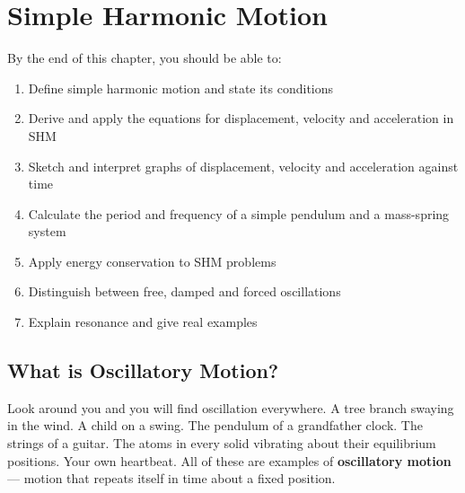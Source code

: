 %

\chapter{Simple Harmonic Motion}
\label{ch:shm}


\begin{objectivebox}
By the end of this chapter, you should be able to:
\begin{enumerate}[noitemsep]
  \item Define simple harmonic motion and state its
  conditions
  \item Derive and apply the equations for displacement,
  velocity and acceleration in SHM
  \item Sketch and interpret graphs of displacement,
  velocity and acceleration against time
  \item Calculate the period and frequency of a simple
  pendulum and a mass-spring system
  \item Apply energy conservation to SHM problems
  \item Distinguish between free, damped and forced
  oscillations
  \item Explain resonance and give real examples
\end{enumerate}
\end{objectivebox}

\vspace{0.4cm}

\minitoc

\vspace{0.5cm}

\section{What is Oscillatory Motion?}

Look around you and you will find oscillation everywhere.
A tree branch swaying in the wind. A child on a swing.
The pendulum of a grandfather clock. The strings of a
guitar. The atoms in every solid vibrating about their
equilibrium positions. Your own heartbeat. All of these
are examples of \textbf{oscillatory motion} --- motion
that repeats itself in time about a fixed position.

